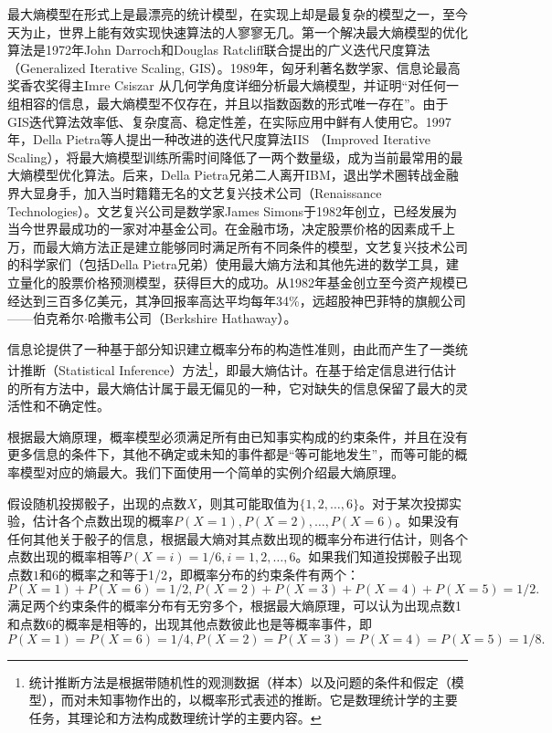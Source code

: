 最大熵模型在形式上是最漂亮的统计模型，在实现上却是最复杂的模型之一，至今天为止，世界上能有效实现快速算法的人寥寥无几。第一个解决最大熵模型的优化算法是1972年John Darroch和Douglas Ratcliff联合提出的广义迭代尺度算法（Generalized Iterative Scaling, GIS）\cite{darroch1972generalized}。1989年，匈牙利著名数学家、信息论最高奖香农奖得主Imre Csiszar 从几何学角度详细分析最大熵模型\cite{csiszar1989geometric}，并证明“对任何一组相容的信息，最大熵模型不仅存在，并且以指数函数的形式唯一存在”。由于GIS迭代算法效率低、复杂度高、稳定性差，在实际应用中鲜有人使用它。1997年，Della Pietra等人提出一种改进的迭代尺度算法IIS （Improved Iterative Scaling）\cite{della1997inducing}，将最大熵模型训练所需时间降低了一两个数量级，成为当前最常用的最大熵模型优化算法。后来，Della Pietra兄弟二人离开IBM，退出学术圈转战金融界大显身手，加入当时籍籍无名的文艺复兴技术公司（Renaissance Technologies）。文艺复兴公司是数学家James Simons于1982年创立，已经发展为当今世界最成功的一家对冲基金公司。在金融市场，决定股票价格的因素成千上万，而最大熵方法正是建立能够同时满足所有不同条件的模型，文艺复兴技术公司的科学家们（包括Della Pietra兄弟）使用最大熵方法和其他先进的数学工具，建立量化的股票价格预测模型，获得巨大的成功。从1982年基金创立至今资产规模已经达到三百多亿美元，其净回报率高达平均每年34\%，远超股神巴菲特的旗舰公司——伯克希尔$\cdot$哈撒韦公司（Berkshire Hathaway）\cite{wu2012math}。

信息论提供了一种基于部分知识建立概率分布的构造性准则，由此而产生了一类统计推断（Statistical Inference）方法\footnote{统计推断方法是根据带随机性的观测数据（样本）以及问题的条件和假定（模型），而对未知事物作出的，以概率形式表述的推断。它是数理统计学的主要任务，其理论和方法构成数理统计学的主要内容。}，即最大熵估计。在基于给定信息进行估计的所有方法中，最大熵估计属于最无偏见的一种，它对缺失的信息保留了最大的灵活性和不确定性\cite{jaynes1957information}。

根据最大熵原理，概率模型必须满足所有由已知事实构成的约束条件，并且在没有更多信息的条件下，其他不确定或未知的事件都是“等可能地发生”，而等可能的概率模型对应的熵最大。我们下面使用一个简单的实例介绍最大熵原理。
\begin{example}
假设随机投掷骰子，出现的点数$X$，则其可能取值为$\{1,2,\ldots,6\}$。对于某次投掷实验，估计各个点数出现的概率$P(X=1), P(X=2), \ldots, P(X=6)$。如果没有任何其他关于骰子的信息，根据最大熵对其点数出现的概率分布进行估计，则各个点数出现的概率相等$P(X=i)=1/6, i = 1, 2, \ldots, 6$。如果我们知道投掷骰子出现点数$1$和$6$的概率之和等于1/2，即概率分布的约束条件有两个：
\[P(X=1) + P(X=6) = 1/2, P(X=2) + P(X=3) + P(X=4) + P(X=5) = 1/2.\]
满足两个约束条件的概率分布有无穷多个，根据最大熵原理，可以认为出现点数1和点数6的概率是相等的，出现其他点数彼此也是等概率事件，即
\[P(X=1) = P(X=6) = 1/4, P(X=2) = P(X=3) = P(X=4) = P(X=5) = 1/8.\]
\end{example}

